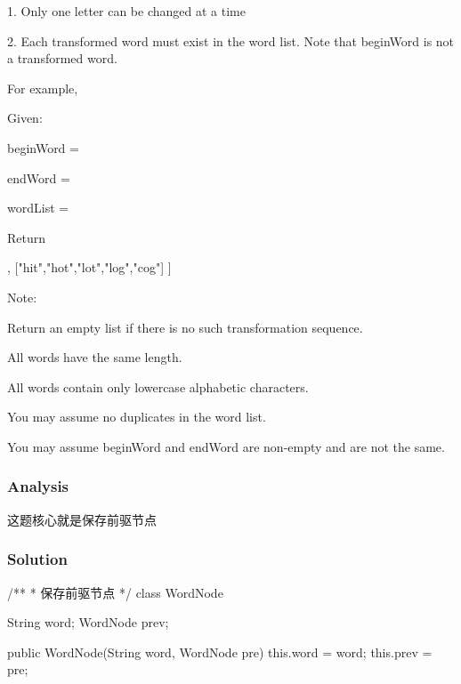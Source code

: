 1. Only one letter can be changed at a time

2. Each transformed word must exist in the word list. Note that beginWord is not a transformed word.

For example,

Given:

beginWord = 

endWord = 

wordList = 

Return
\begin{Code}
  [
    ["hit","hot","dot","dog","cog"],
    ["hit","hot","lot","log","cog"]
  ]
\end{Code}

Note:

Return an empty list if there is no such transformation sequence.

All words have the same length.

All words contain only lowercase alphabetic characters.

You may assume no duplicates in the word list.

You may assume beginWord and endWord are non-empty and are not the same.

\subsubsection{Analysis}
这题核心就是保存前驱节点

\subsubsection{Solution}

\begin{Code}
/**
 * 保存前驱节点
 */
class WordNode {
    String word;
    WordNode prev;

    public WordNode(String word, WordNode pre) {
        this.word = word;
        this.prev = pre;
    }
}
\end{Code}

\newpage

